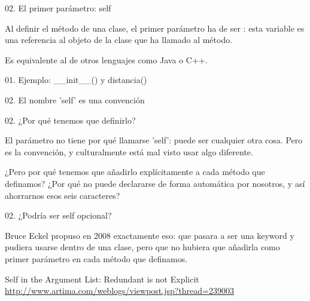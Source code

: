 
\begin{frame}{02. El primer parámetro: self}
  \begin{block}{}
    \centering
    Al definir el método de una clase, el primer parámetro ha de ser
    : esta variable es una referencia al objeto de la
    clase que ha llamado al método.
  \end{block}

  \begin{center}
    \small Es equivalente al  de otros lenguajes como
    Java o C++.
  \end{center}
\end{frame}

\begin{frame}{01. Ejemplo: \_\_init\_\_() y distancia()}
  \footnotesize
  \vspace{0.10cm}
\end{frame}

\begin{frame}{02. El nombre 'self' es una convención}
  \footnotesize
  \scriptsize
\end{frame}

\begin{frame}{02. ¿Por qué tenemos que definirlo?}
  \begin{center}
    El parámetro no tiene por qué llamarse 'self': puede ser cualquier
    otra cosa. Pero  es la convención, y culturalmente
    está mal visto usar algo diferente.
  \end{center}

  \begin{alertblock}{}
    \centering
    ¿Pero por qué tenemos que añadirlo explícitamente a cada método
    que definamos?  ¿Por qué no puede declararse de forma automática
    por nosotros, y así ahorrarnos esos seis caracteres?
  \end{alertblock}
\end{frame}

\begin{frame}{02. ¿Podría ser self opcional?}
  \begin{center}
    Bruce Eckel propuso en 2008 exactamente eso: que 
    pasara a ser una keyword y pudiera usarse dentro de una clase,
    pero que no hubiera que añadirla como primer parámetro en cada
    método que definamos.
  \end{center}

  \footnotesize
  \begin{block}{\centering Self in the Argument List: Redundant is not Explicit}
    \centering \url{http://www.artima.com/weblogs/viewpost.jsp?thread=239003}
  \end{block}
\end{frame}

